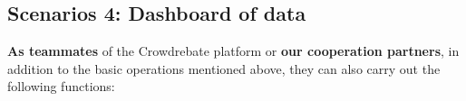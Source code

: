 \subsection{Scenarios 4: Dashboard of data}

\textbf{As teammates} of the Crowdrebate platform or \textbf{our cooperation partners}, in addition to the basic operations mentioned above, they can also carry out the following functions:

\begin{figure}[t!] \vspace{-2ex}
\end{figure}
